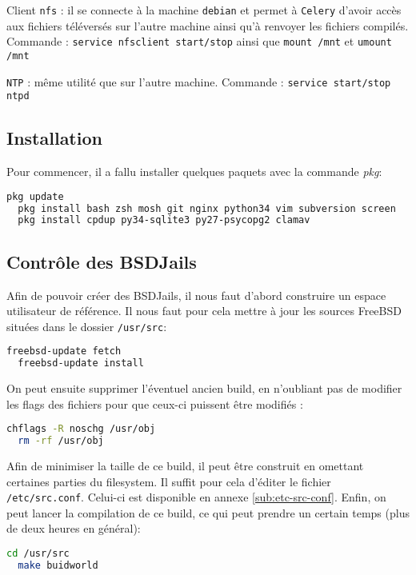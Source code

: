 \documentclass[10pt,a4paper]{article}
\begin{document}
\vspace{1em} %
Client \texttt{nfs} : il se connecte à la machine \texttt{debian} et permet à \texttt{Celery} d'avoir accès aux fichiers téléversés sur l'autre machine ainsi qu'à renvoyer les fichiers compilés.
Commande : \texttt{service nfsclient start/stop} ainsi que \texttt{mount /mnt} et \texttt{umount /mnt}

\texttt{NTP} : même utilité que sur l'autre machine.
Commande : \texttt{service start/stop ntpd}

\subsection{Installation}
Pour commencer, il a fallu installer quelques paquets avec la commande \emph{pkg}:
\begin{lstlisting}[language=bash]
  pkg update
  pkg install bash zsh mosh git nginx python34 vim subversion screen
  pkg install cpdup py34-sqlite3 py27-psycopg2 clamav
\end{lstlisting}

\subsection{Contrôle des BSDJails}
\label{subs:Contrôle des BSDJails}
Afin de pouvoir créer des BSDJails, il nous faut d'abord construire un espace utilisateur de référence.
Il nous faut pour cela mettre à jour les sources FreeBSD situées dans le dossier \texttt{/usr/src}:
\begin{lstlisting}[language=bash]
  freebsd-update fetch
  freebsd-update install
\end{lstlisting}
On peut ensuite supprimer l'éventuel ancien build, en n'oubliant pas de modifier les flags des fichiers pour que ceux-ci puissent être modifiés :
\begin{lstlisting}[language=bash]
  chflags -R noschg /usr/obj
  rm -rf /usr/obj
\end{lstlisting}
Afin de minimiser la taille de ce build, il peut être construit en omettant certaines parties du filesystem. Il suffit pour cela d'éditer le fichier \texttt{/etc/src.conf}. Celui-ci est disponible en annexe \ref{sub:etc-src-conf}.
Enfin, on peut lancer la compilation de ce build, ce qui peut prendre un certain temps (plus de deux heures en général):
\begin{lstlisting}[language=bash]
  cd /usr/src
  make buidworld
\end{lstlisting}
\end{document}
